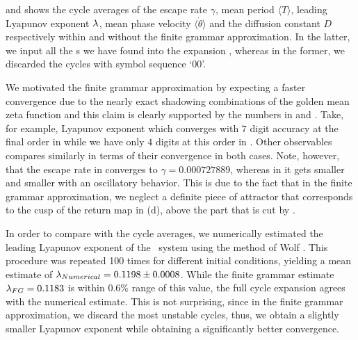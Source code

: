  and  shows
the cycle averages of the escape rate $\gamma$, mean period 
$\langle T \rangle$, leading Lyapunov exponent $\lambda$, mean phase velocity 
$\langle \dot{\theta} \rangle$ and the diffusion constant $D$ respectively 
within and without the finite grammar approximation. In the latter, we input 
all the \rpo s we have found into the expansion 
, whereas in the former, we discarded the 
cycles with symbol sequence `00'.




We motivated the finite grammar approximation by expecting a faster convergence
due to the nearly exact shadowing combinations of the golden mean zeta function 
 and this claim is clearly supported by the
numbers in  and 
. Take, for example, Lyapunov exponent 
which converges with $7$ digit accuracy at the final order in 
 while we have only $4$ digits at this order in 
. Other observables compares similarly in 
terms of their convergence in both cases. Note, however, that the escape rate 
in  converges to $\gamma = 0.000727889$, whereas 
in  it gets smaller and smaller with an 
oscillatory behavior. This is due to the fact that in the finite grammar 
approximation, we neglect a definite piece of attractor that corresponds to the
cusp of the return map in  (d), above the part that
is cut by .

In order to compare with the cycle averages, we numerically estimated the
leading Lyapunov exponent of the \twomode\ system using the method of
Wolf \etal{}. This procedure was repeated 100 times for
different initial conditions, yielding a mean estimate of
$\lambda_{Numerical} = 0.1198 \pm 0.0008$. While the finite grammar
estimate $\lambda_{FG} = 0.1183$ is within $0.6\%$ range of this value,
the full cycle expansion agrees with the numerical estimate. This is not
surprising, since in the finite grammar approximation, we discard the
most unstable cycles, thus, we obtain a slightly smaller Lyapunov
exponent while obtaining a significantly better convergence.
